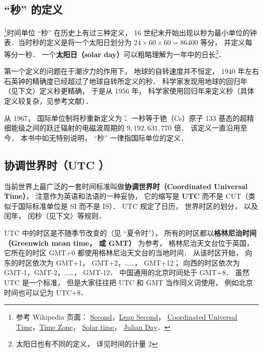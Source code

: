 
\begin{issues}
\end{issues}

\subsection{“秒” 的定义}
\footnote{参考 Wikipedia 页面： \href{https://en.wikipedia.org/wiki/Second}{Second}，\href{https://en.wikipedia.org/wiki/Leap_second}{Leap Second}， \href{https://en.wikipedia.org/wiki/Coordinated_Universal_Time}{Coordinated Universal Time}，\href{https://en.wikipedia.org/wiki/Time_zone}{Time Zone}， \href{https://en.wikipedia.org/wiki/Solar_time}{Solar time}， \href{https://en.wikipedia.org/wiki/Julian_day}{Julian Day}．}时间单位 “秒” 在历史上有过三种定义， 16 世纪末开始出现以秒为最小单位的钟表．当时秒的定义是将一个太阳日划分为 $24\times60\times60 = 86400$ 等分， 并定义每等分一秒． 一个\textbf{太阳日（solar day）}可以粗略理解为一年中的日长\footnote{太阳日也有不同的定义， 详见时间的计量 2}．

第一个定义的问题在于潮汐力的作用下， 地球的自转速度并不恒定， 1940 年左右石英钟的精确度已经超过了地球自转所定义的秒． 科学家发现用地球的回归年（见下文）定义秒更精确， 于是从 1956 年， 科学家使用回归年来定义秒（具体定义较复杂，见参考文献）．

从 1967， 国际单位制将秒重新定义为： 一秒等于铯（Cs）原子 133 基态的超精细能级之间的跃迁辐射的电磁波周期的 $9,192,631,770$ 倍． 该定义一直沿用至今． 本书中如无特别说明， “秒” 一律指国际单位的定义．

\subsection{协调世界时（UTC ）}
当前世界上最广泛的一套时间标准叫做\textbf{协调世界时（Coordinated Universal Time）}， 注意作为英语和法语的一种妥协， 它的缩写是 \textbf{UTC} 而不是 CUT（类似于国际标准单位是 SI 而不是 IS）． UTC 规定了日历， 世界时区的划分， 以及闰年， 闰秒（见下文）等规则．

UTC 中的时区是不随季节改变的（见 “夏令时”）， 所有的时区都以\textbf{格林尼治时间（Greenwich mean time， 或 GMT）} 为参考， 格林尼治天文台位于英国， 它所在的时区 GMT+0 都使用格林尼治天文台的当地时间． 从该时区开始， 向东的时区依次为 GMT+1， GMT+2，……， GMT+12； 向西的时区依次为 GMT-1，GMT-2，……， GMT-12． 中国通用的北京时间处于 GMT+8． 虽然 UTC 是一个标准， 但是大家往往把 UTC 和 GMT 当作同义词使用， 例如北京时间也可以记为 UTC+8．

